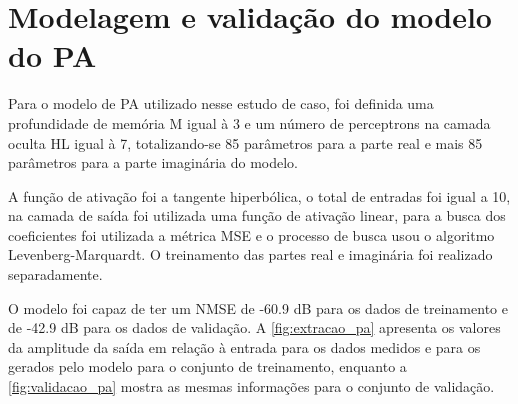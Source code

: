 \section{Modelagem e validação do modelo do PA} \label{sec:estudoi-model}
Para o modelo de PA utilizado nesse estudo de caso, foi definida uma profundidade de memória M igual à 3 e um número de perceptrons na camada oculta HL igual à 7, totalizando-se 85 parâmetros para a parte real e mais 85 parâmetros para a parte imaginária do modelo.


A função de ativação foi a tangente hiperbólica, o total de entradas foi igual a 10, na camada de saída foi utilizada uma função de ativação linear, para a busca dos coeficientes foi utilizada a métrica MSE e o processo de busca usou o algoritmo Levenberg-Marquardt. O treinamento das partes real e imaginária foi realizado separadamente.

O modelo foi capaz de ter um NMSE de -60.9 dB para os dados de treinamento e de -42.9 dB para os dados de validação. A \autoref{fig:extracao_pa} apresenta os valores da amplitude da saída em relação à entrada para os dados medidos e para os gerados pelo modelo para o conjunto de treinamento, enquanto a \autoref{fig:validacao_pa} mostra as mesmas informações para o conjunto de validação.

